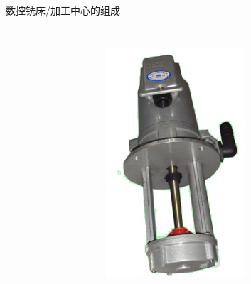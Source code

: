 \documentclass[UTF8,zihao=-4]{ctexbeamer}
\begin{document}
\begin{frame}{数控铣床/加工中心的组成}
\begin{columns}
\begin{figure}
		\label{fig:1-15}
	\end{figure}
	\begin{figure}
	\centering
	\includegraphics[width= \linewidth]{image/1-16}
	\label{fig:1-16}
\end{figure}
	\begin{figure}
	\centering

\end{figure}
\end{columns}
\end{frame}
\end{document}

